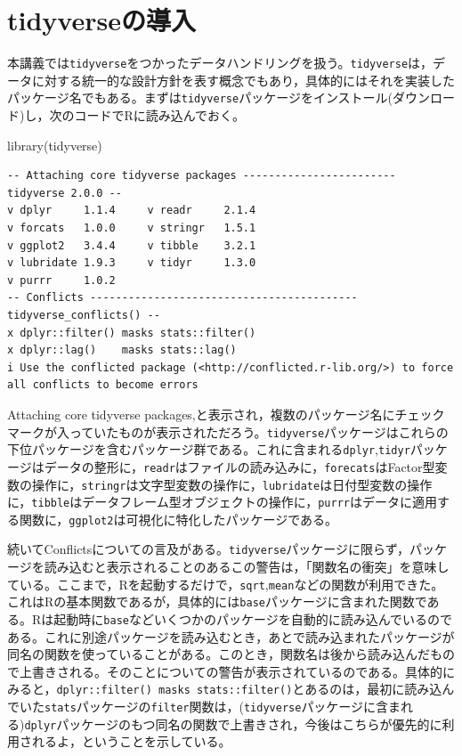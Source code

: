 \documentclass[
  a4paper,
]{ltjsbook}
\newenvironment{Shaded}{\begin{snugshade}}{\end{snugshade}}
\newcommand{\FunctionTok}[1]{\textcolor[rgb]{0.28,0.35,0.67}{#1}}
\newcommand{\NormalTok}[1]{\textcolor[rgb]{0.00,0.23,0.31}{#1}}
\begin{document}
\section{tidyverseの導入}\label{tidyverseux306eux5c0eux5165}

本講義では\texttt{tidyverse}をつかったデータハンドリングを扱う。\texttt{tidyverse}は，データに対する統一的な設計方針を表す概念でもあり，具体的にはそれを実装したパッケージ名でもある。まずは\texttt{tidyverse}パッケージをインストール(ダウンロード)し，次のコードでRに読み込んでおく。

\begin{Shaded}
\begin{Highlighting}[]
\FunctionTok{library}\NormalTok{(tidyverse)}
\end{Highlighting}
\end{Shaded}

\begin{verbatim}
-- Attaching core tidyverse packages ------------------------ tidyverse 2.0.0 --
v dplyr     1.1.4     v readr     2.1.4
v forcats   1.0.0     v stringr   1.5.1
v ggplot2   3.4.4     v tibble    3.2.1
v lubridate 1.9.3     v tidyr     1.3.0
v purrr     1.0.2     
-- Conflicts ------------------------------------------ tidyverse_conflicts() --
x dplyr::filter() masks stats::filter()
x dplyr::lag()    masks stats::lag()
i Use the conflicted package (<http://conflicted.r-lib.org/>) to force all conflicts to become errors
\end{verbatim}

Attaching core tidyverse
packages,と表示され，複数のパッケージ名にチェックマークが入っていたものが表示されただろう。\texttt{tidyverse}パッケージはこれらの下位パッケージを含むパッケージ群である。これに含まれる\texttt{dplyr},\texttt{tidyr}パッケージはデータの整形に，\texttt{readr}はファイルの読み込みに，\texttt{forecats}はFactor型変数の操作に，\texttt{stringr}は文字型変数の操作に，\texttt{lubridate}は日付型変数の操作に，\texttt{tibble}はデータフレーム型オブジェクトの操作に，\texttt{purrr}はデータに適用する関数に，\texttt{ggplot2}は可視化に特化したパッケージである。

続いてConflictsについての言及がある。\texttt{tidyverse}パッケージに限らず，パッケージを読み込むと表示されることのあるこの警告は，「関数名の衝突」を意味している。ここまで，Rを起動するだけで，\texttt{sqrt},\texttt{mean}などの関数が利用できた。これはRの基本関数であるが，具体的には\texttt{base}パッケージに含まれた関数である。Rは起動時に\texttt{base}などいくつかのパッケージを自動的に読み込んでいるのである。これに別途パッケージを読み込むとき，あとで読み込まれたパッケージが同名の関数を使っていることがある。このとき，関数名は後から読み込んだもので上書きされる。そのことについての警告が表示されているのである。具体的にみると，\texttt{dplyr::filter()\ masks\ stats::filter()}とあるのは，最初に読み込んでいた\texttt{stats}パッケージの\texttt{filter}関数は，(\texttt{tidyverse}パッケージに含まれる)\texttt{dplyr}パッケージのもつ同名の関数で上書きされ，今後はこちらが優先的に利用されるよ，ということを示している。
\end{document}
